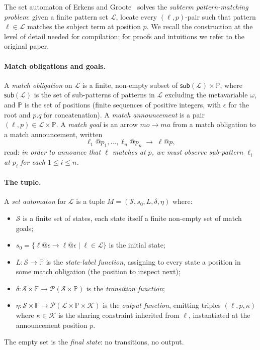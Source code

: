 \documentclass[11pt]{article}
\theoremstyle{plain}
\theoremstyle{definition}
\theoremstyle{remark}
\newcommand{\Pos}{\mathbb{P}}
\newcommand{\States}{\mathcal{S}}
\newcommand{\Lhs}{\mathcal{L}}
\begin{document}
The set automaton of Erkens and Groote~\cite{ErkensGroote2021} solves the
\emph{subterm pattern-matching problem}: given a finite pattern set $\Lhs$,
locate every $(\ell, p)$-pair such that pattern $\ell \in \Lhs$ matches the
subject term at position $p$. We recall the construction at the level of
detail needed for compilation; for proofs and intuitions we refer to the
original paper.

\paragraph{Match obligations and goals.}
A \emph{match obligation} on $\Lhs$ is a finite, non-empty subset of
$\mathsf{sub}(\Lhs) \times \Pos$, where $\mathsf{sub}(\Lhs)$ is the set of
sub-patterns of patterns in $\Lhs$ excluding the metavariable $\omega$, and
$\Pos$ is the set of positions (finite sequences of positive integers, with
$\epsilon$ for the root and $p.q$ for concatenation). A \emph{match
announcement} is a pair $(\ell, p) \in \Lhs \times \Pos$. A \emph{match
goal} is an arrow $mo \to ma$ from a match obligation to a match
announcement, written
\[
  \ell_1 @ p_1, \ldots, \ell_n @ p_n \;\to\; \ell @ p,
\]
read: \emph{in order to announce that $\ell$ matches at $p$, we must
observe sub-pattern $\ell_i$ at $p_i$ for each $1 \le i \le n$.}

\paragraph{The tuple.}
A \emph{set automaton} for $\Lhs$ is a tuple
$M = (\States, s_0, L, \delta, \eta)$ where:
\begin{itemize}[leftmargin=*]
  \item $\States$ is a finite set of states, each state itself a finite
        non-empty set of match goals;
  \item $s_0 = \{\ell @ \epsilon \to \ell @ \epsilon \mid \ell \in \Lhs\}$
        is the initial state;
  \item $L : \States \to \Pos$ is the \emph{state-label function},
        assigning to every state a position in some match obligation
        (the position to inspect next);
  \item $\delta : \States \times \mathbb{F} \to \mathcal{P}(\States \times \Pos)$
        is the \emph{transition function};
  \item $\eta : \States \times \mathbb{F} \to \mathcal{P}(\Lhs \times \Pos \times \mathcal{K})$
        is the \emph{output function}, emitting triples $(\ell, p, \kappa)$
        where $\kappa \in \mathcal{K}$ is the sharing constraint inherited
        from $\ell$, instantiated at the announcement position $p$.
\end{itemize}
The empty set is the \emph{final state}: no transitions, no output.
\end{document}
